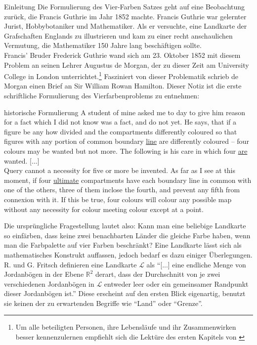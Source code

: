 \begin{chapter}{Einleitung}
 Die Formulierung des Vier-Farben Satzes geht auf eine Beobachtung zurück, die Francis Guthrie im Jahr 1852 machte. Francis Guthrie war gelernter Jurist, Hobbybotaniker und Mathematiker. Als er versuchte, eine Landkarte der Grafschaften Englands zu illustrieren und kam zu einer recht anschaulichen Vermutung, die Mathematiker 150 Jahre lang beschäftigen sollte. \\
 Francis' Bruder Frederick Guthrie wand sich am 23. Oktober 1852 mit diesem Problem an seinen Lehrer Augustus de Morgan, der zu dieser Zeit am University College in London unterrichtet.\footnote{Um alle beteiligten Personen, ihre Lebensläufe und ihr Zusammenwirken besser kennenzulernen empfiehlt sich die Lektüre des ersten Kapitels von \cite{fritsch}} Fasziniert von dieser Problematik schrieb de Morgan einen Brief an Sir William Rowan Hamilton. Dieser Notiz ist die erste schriftliche Formulierung des Vierfarbenproblems zu entnehmen:
 
 \begin{satz}{historische Formulierung}
  A student of mine asked me to day to give him reason for a fact which I did not know was a fact, and do not yet. He says, that if a figure be any how divided and the compartments differently coloured so that figures with any portion of common boundary \underline{line} are differently coloured -- four colours may be wanted but not more. The following is his care in which four \underline{are} wanted. [...]\\
  Query cannot a necessity for five or more be invented. As far as I see at this moment, if four \underline{ultimate} compartments have each boundary line in common with one of the others, three of them inclose the fourth, and prevent any fifth from connexion with it. If this be true, four colours will colour any possible map without any necessity for colour meeting colour except at a point. \cite{fritsch}
 \end{satz}
 
 Die ursprüngliche Fragestellung lautet also: Kann man eine beliebige Landkarte so einfärben, dass keine zwei benachbarten Länder die gleiche Farbe haben, wenn man die Farbpalette auf vier Farben beschränkt? Eine Landkarte lässt sich als mathematisches Konstrukt auffassen, jedoch bedarf es dazu einiger Überlegungen. R. und G. Fritsch definieren eine Landkarte $\mathcal{L}$ als ``[...] eine endliche Menge von Jordanbögen in der Ebene $\mathbb{R}^2$ derart, dass der Durchschnitt von je zwei verschiedenen Jordanbögen in $\mathcal{L}$ entweder leer oder ein gemeinsamer Randpunkt dieser Jordanbögen ist.'' \cite{fritsch} Diese erscheint auf den ersten Blick eigenartig, benutzt sie keinen der zu erwartenden Begriffe wie ``Land'' oder ``Grenze''. 
 

\end{chapter}
